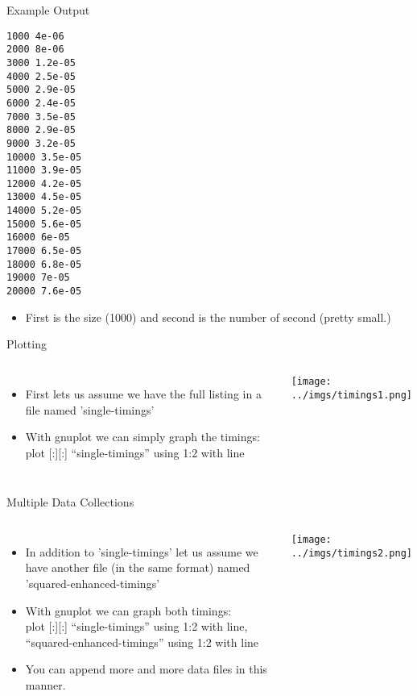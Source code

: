 \documentclass{beamer}
\begin{document}
\begin{frame}[fragile]{Example Output}
\begin{lstlisting}
1000 4e-06
2000 8e-06
3000 1.2e-05
4000 2.5e-05
5000 2.9e-05
6000 2.4e-05
7000 3.5e-05
8000 2.9e-05
9000 3.2e-05
10000 3.5e-05
11000 3.9e-05
12000 4.2e-05
13000 4.5e-05
14000 5.2e-05
15000 5.6e-05
16000 6e-05
17000 6.5e-05
18000 6.8e-05
19000 7e-05
20000 7.6e-05
\end{lstlisting}
\begin{itemize}
\item First is the size (1000) and second is the number of second (pretty small.)
\end{itemize}
\end{frame}

\begin{frame}{Plotting}
\begin{columns}
\begin{itemize}
\item First lets us assume we have the full listing in a file named 'single-timings'
\item With gnuplot we can simply graph the timings: \\
plot [:][:] ``single-timings'' using 1:2 with line
\end{itemize}
\texttt{[image: ../imgs/timings1.png]}
\end{columns}
\end{frame}

\begin{frame}{Multiple Data Collections}
\begin{columns}
\begin{itemize}
\item In addition to 'single-timings' let us assume we have another file (in the same format) named 'squared-enhanced-timings'
\item With gnuplot we can graph both timings: \\
plot [:][:] ``single-timings'' using 1:2 with line, ``squared-enhanced-timings'' using 1:2 with line
\item {\tiny You can append more and more data files in this manner.}
\end{itemize}
\texttt{[image: ../imgs/timings2.png]}
\end{columns}
\end{frame}
\end{document}
